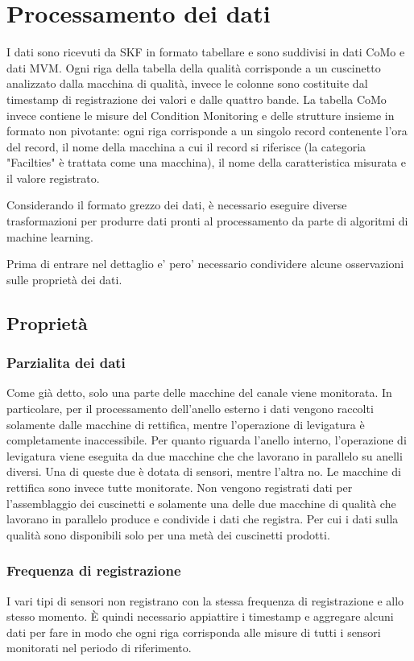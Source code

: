 \section{Processamento dei dati}
I dati sono ricevuti da SKF in formato tabellare e sono suddivisi in dati CoMo e dati MVM. Ogni riga della tabella della qualità corrisponde a un cuscinetto analizzato dalla macchina di qualità, invece le colonne sono costituite dal timestamp di registrazione dei valori e dalle quattro bande.
La tabella CoMo invece contiene le misure del Condition Monitoring e delle strutture insieme in formato non pivotante: ogni riga corrisponde a un singolo record contenente l'ora del record, il nome della macchina a cui il record si riferisce (la categoria "Facilties" è trattata come una macchina), il nome della caratteristica misurata e il valore registrato.

Considerando il formato grezzo dei dati, è necessario eseguire diverse trasformazioni per produrre dati pronti al processamento da parte di algoritmi di machine learning. 

Prima di entrare nel dettaglio e' pero' necessario condividere alcune osservazioni sulle proprietà dei dati.

\subsection{Proprietà}

\subsubsection{Parzialita dei dati}
Come già detto, solo una parte delle macchine del canale viene monitorata.
In particolare, per il processamento dell'anello esterno i dati vengono raccolti solamente dalle macchine di rettifica, mentre l'operazione di levigatura è completamente inaccessibile.
Per quanto riguarda l'anello interno, l'operazione di levigatura viene eseguita da due macchine che che lavorano in parallelo su anelli diversi. Una di queste due è dotata di sensori, mentre l'altra no. Le macchine di rettifica sono invece tutte monitorate.
Non vengono registrati dati per l'assemblaggio dei cuscinetti e solamente una delle due macchine di qualità che lavorano in parallelo produce e condivide i dati che registra. Per cui i dati sulla qualità sono disponibili solo per una metà dei cuscinetti prodotti.

\subsubsection{Frequenza di registrazione}
I vari tipi di sensori non registrano con la stessa frequenza di registrazione e allo stesso momento.
È quindi necessario appiattire i timestamp e aggregare alcuni dati per fare in modo che ogni riga corrisponda alle misure di tutti i sensori monitorati nel periodo di riferimento.


